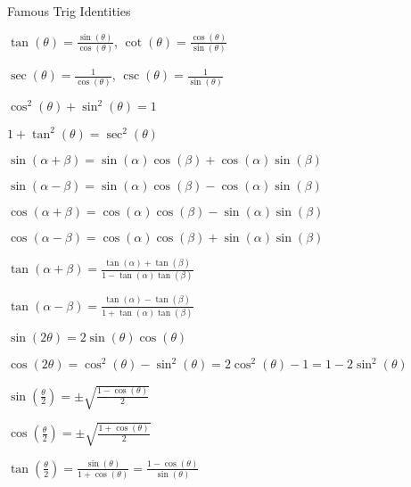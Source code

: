 \documentclass{ximera}
\begin{document}
\begin{center}
{\Large Famous Trig Identities}
\end{center}

$\tan(\theta)=\frac{\sin(\theta)}{\cos(\theta)}$, $\cot(\theta)=\frac{\cos(\theta)}{\sin(\theta)}$

$\sec(\theta)=\frac{1}{\cos(\theta)}$, $\csc(\theta)=\frac{1}{\sin(\theta)}$

$\cos^2(\theta)+\sin^2(\theta)=1$

$1+\tan^2(\theta)=\sec^2(\theta)$

$\sin(\alpha+\beta)=\sin(\alpha)\cos(\beta)+\cos(\alpha)\sin(\beta)$

$\sin(\alpha-\beta)=\sin(\alpha)\cos(\beta)-\cos(\alpha)\sin(\beta)$

$\cos(\alpha+\beta)=\cos(\alpha)\cos(\beta)-\sin(\alpha)\sin(\beta)$

$\cos(\alpha-\beta)=\cos(\alpha)\cos(\beta)+\sin(\alpha)\sin(\beta)$

$\tan(\alpha+\beta)=\frac{\tan(\alpha)+\tan(\beta)}{1-\tan(\alpha)\tan(\beta)}$

$\tan(\alpha-\beta)=\frac{\tan(\alpha)-\tan(\beta)}{1+\tan(\alpha)\tan(\beta)}$

$\sin(2\theta)=2\sin(\theta)\cos(\theta)$

$\cos(2\theta)=\cos^2(\theta)-\sin^2(\theta) = 2\cos^2(\theta)-1 = 1-2\sin^2(\theta)$

$\sin(\frac{\theta}{2})=\pm\sqrt{\frac{1-\cos(\theta)}{2}}$

$\cos(\frac{\theta}{2})=\pm\sqrt{\frac{1+\cos(\theta)}{2}}$

$\tan(\frac{\theta}{2})=\frac{\sin(\theta)}{1+\cos(\theta)}=\frac{1-\cos(\theta)}{\sin(\theta)}$
\end{document}
